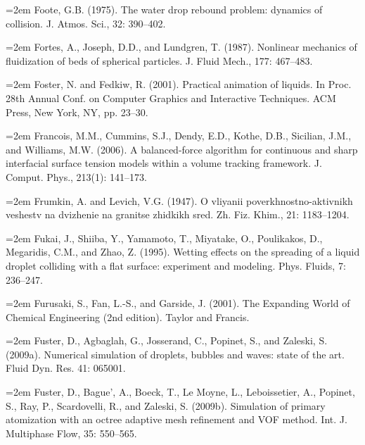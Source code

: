 \documentclass[11pt,a4paper,openany,fontset=none]{ctexbook}
\begin{document}
\par\hangindent=2em Foote, G.B. (1975). The water drop rebound problem: dynamics of collision. J. Atmos. Sci., 32: 390--402.

\par\hangindent=2em Fortes, A., Joseph, D.D., and Lundgren, T. (1987). Nonlinear mechanics of fluidization of beds of spherical particles. J. Fluid Mech., 177: 467--483.


\par\hangindent=2em Foster, N. and Fedkiw, R. (2001). Practical animation of liquids. In Proc. 28th Annual Conf. on Computer Graphics and Interactive Techniques. ACM Press, New York, NY, pp. 23--30.

\par\hangindent=2em Francois, M.M., Cummins, S.J., Dendy, E.D., Kothe, D.B., Sicilian, J.M., and Williams, M.W. (2006). A balanced-force algorithm for continuous and sharp interfacial surface tension models within a volume tracking framework. J. Comput. Phys., 213(1): 141--173.

\par\hangindent=2em Frumkin, A. and Levich, V.G. (1947). O vliyanii poverkhnostno-aktivnikh veshestv na dvizhenie na granitse zhidkikh sred. Zh. Fiz. Khim., 21: 1183--1204.

\par\hangindent=2em Fukai, J., Shiiba, Y., Yamamoto, T., Miyatake, O., Poulikakos, D., Megaridis, C.M., and Zhao, Z. (1995). Wetting effects on the spreading of a liquid droplet colliding with a flat surface: experiment and modeling. Phys. Fluids, 7: 236--247.

\par\hangindent=2em Furusaki, S., Fan, L.-S., and Garside, J. (2001). The Expanding World of Chemical Engineering (2nd edition). Taylor and Francis.

\par\hangindent=2em Fuster, D., Agbaglah, G., Josserand, C., Popinet, S., and Zaleski, S. (2009a). Numerical simulation of droplets, bubbles and waves: state of the art. Fluid Dyn. Res. 41: 065001.

\par\hangindent=2em Fuster, D., Bague', A., Boeck, T., Le Moyne, L., Leboissetier, A., Popinet, S., Ray, P., Scardovelli, R., and Zaleski, S. (2009b). Simulation of primary atomization with an octree adaptive mesh refinement and VOF method. Int. J. Multiphase Flow, 35: 550--565.
\end{document}
